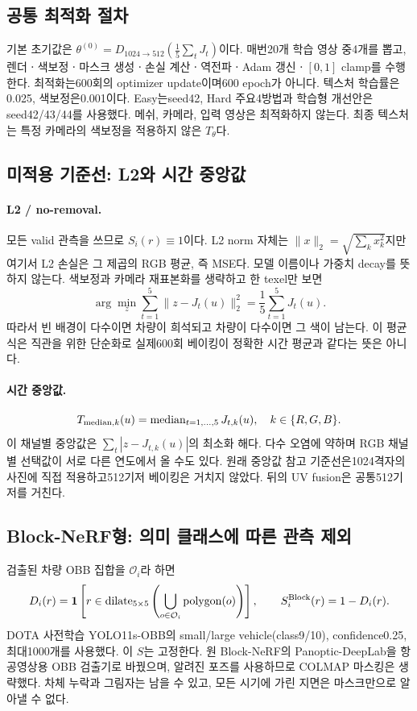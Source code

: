 \documentclass[11pt,a4paper]{article}
\newcommand{\ind}{\mathbf{1}}
\newcommand{\med}{\operatorname{median}}
\newcommand{\dilate}{\operatorname{dilate}}
\begin{document}
\subsection{공통 최적화 절차}
기본 초기값은 $\theta^{(0)}=D_{1024\to512}(\frac15\sum_tJ_t)$이다. 매번20개 학습 영상 중4개를 뽑고, 렌더ㆍ색보정ㆍ마스크 생성ㆍ손실 계산ㆍ역전파ㆍAdam 갱신ㆍ$[0,1]$ clamp를 수행한다. 최적화는600회의 optimizer update이며600 epoch가 아니다. 텍스처 학습률은0.025, 색보정은0.001이다. Easy는seed42, Hard 주요4방법과 학습형 개선안은seed42/43/44를 사용했다. 메쉬, 카메라, 입력 영상은 최적화하지 않는다. 최종 텍스처는 특정 카메라의 색보정을 적용하지 않은 $T_\theta$다.

\subsection{미적용 기준선: L2와 시간 중앙값}
\paragraph{L2 / no-removal.}
모든 valid 관측을 쓰므로 $S_i(r)\equiv1$이다. L2 norm 자체는 $\|x\|_2=\sqrt{\sum_kx_k^2}$지만 여기서 L2 손실은 그 제곱의 RGB 평균, 즉 MSE다. 모델 이름이나 가중치 decay를 뜻하지 않는다. 색보정과 카메라 재표본화를 생략하고 한 texel만 보면
\begin{equation}
 \arg\min_z\sum_{t=1}^5\|z-J_t(u)\|_2^2
 =\frac15\sum_{t=1}^5J_t(u).
\end{equation}
따라서 빈 배경이 다수이면 차량이 희석되고 차량이 다수이면 그 색이 남는다. 이 평균식은 직관을 위한 단순화로 실제600회 베이킹이 정확한 시간 평균과 같다는 뜻은 아니다.

\paragraph{시간 중앙값.}
\begin{equation}
 T_{{\rm median},k}(u)=\med_{t=1,\ldots,5}J_{t,k}(u),\quad k\in\{R,G,B\}.
\end{equation}
이 채널별 중앙값은 $\sum_t|z-J_{t,k}(u)|$의 최소화 해다. 다수 오염에 약하며 RGB 채널별 선택값이 서로 다른 연도에서 올 수도 있다. 원래 중앙값 참고 기준선은1024격자의 사진에 직접 적용하고512기저 베이킹은 거치지 않았다. 뒤의 UV fusion은 공통512기저를 거친다.

\subsection{Block-NeRF형: 의미 클래스에 따른 관측 제외}
검출된 차량 OBB 집합을 $\mathcal O_i$라 하면
\begin{equation}
 D_i(r)=\ind\left[r\in\dilate_{5\times5}\left(\bigcup_{o\in\mathcal O_i}\operatorname{polygon}(o)\right)\right],
 \qquad S_i^{\rm Block}(r)=1-D_i(r).
\end{equation}
DOTA 사전학습 YOLO11s-OBB의 small/large vehicle(class9/10), confidence0.25, 최대1000개를 사용했다. 이 $S$는 고정한다. 원 Block-NeRF의 Panoptic-DeepLab을 항공영상용 OBB 검출기로 바꿨으며, 알려진 포즈를 사용하므로 COLMAP 마스킹은 생략했다. 차체 누락과 그림자는 남을 수 있고, 모든 시기에 가린 지면은 마스크만으로 알아낼 수 없다.
\end{document}
